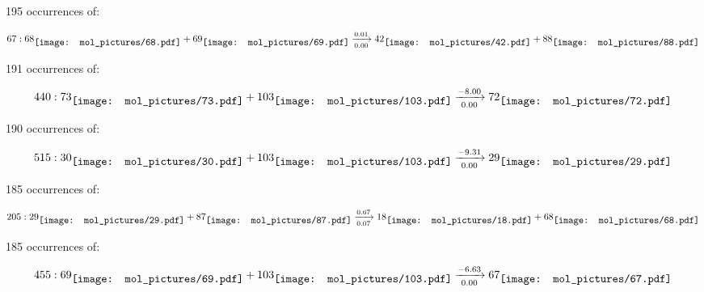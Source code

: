 \documentclass{article}
\begin{document}
\vspace{1cm}


195 occurrences of:

$$
67:  
68
\raisebox{-.5\height}{\texttt{[image: mol\_pictures/68.pdf]}}
+
69
\raisebox{-.5\height}{\texttt{[image: mol\_pictures/69.pdf]}}
\xrightarrow[0.00]{0.01}
42
\raisebox{-.5\height}{\texttt{[image: mol\_pictures/42.pdf]}}
+
88
\raisebox{-.5\height}{\texttt{[image: mol\_pictures/88.pdf]}}
$$



\vspace{1cm}


191 occurrences of:

$$
440:  
73
\raisebox{-.5\height}{\texttt{[image: mol\_pictures/73.pdf]}}
+
103
\raisebox{-.5\height}{\texttt{[image: mol\_pictures/103.pdf]}}
\xrightarrow[0.00]{-8.00}
72
\raisebox{-.5\height}{\texttt{[image: mol\_pictures/72.pdf]}}
$$



\vspace{1cm}


190 occurrences of:

$$
515:  
30
\raisebox{-.5\height}{\texttt{[image: mol\_pictures/30.pdf]}}
+
103
\raisebox{-.5\height}{\texttt{[image: mol\_pictures/103.pdf]}}
\xrightarrow[0.00]{-9.31}
29
\raisebox{-.5\height}{\texttt{[image: mol\_pictures/29.pdf]}}
$$



\vspace{1cm}


185 occurrences of:

$$
205:  
29
\raisebox{-.5\height}{\texttt{[image: mol\_pictures/29.pdf]}}
+
87
\raisebox{-.5\height}{\texttt{[image: mol\_pictures/87.pdf]}}
\xrightarrow[0.07]{0.67}
18
\raisebox{-.5\height}{\texttt{[image: mol\_pictures/18.pdf]}}
+
68
\raisebox{-.5\height}{\texttt{[image: mol\_pictures/68.pdf]}}
$$



\vspace{1cm}


185 occurrences of:

$$
455:  
69
\raisebox{-.5\height}{\texttt{[image: mol\_pictures/69.pdf]}}
+
103
\raisebox{-.5\height}{\texttt{[image: mol\_pictures/103.pdf]}}
\xrightarrow[0.00]{-6.63}
67
\raisebox{-.5\height}{\texttt{[image: mol\_pictures/67.pdf]}}
$$
\end{document}
